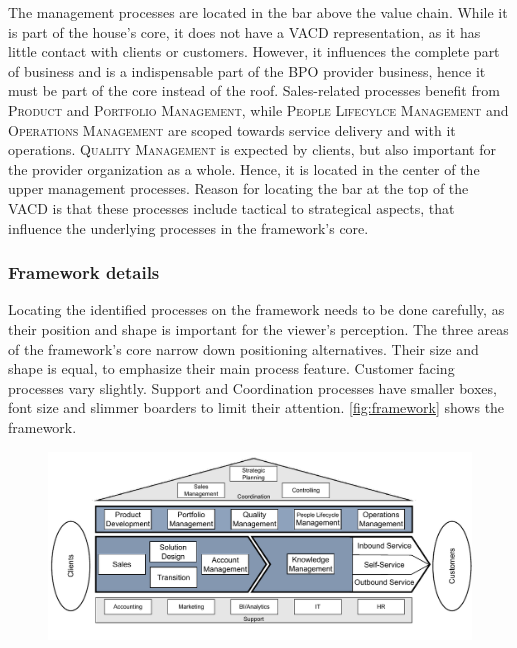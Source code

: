 	The management processes are located in the bar above the value chain. While it is part of the house's core, it does not have a \acrshort{VACD} representation, as it has little contact with clients or customers. However, it influences the complete part of business and is a indispensable part of the \acrshort{BPO} provider business, hence it must be part of the core instead of the roof. Sales-related processes benefit from \textsc{Product} and \textsc{Portfolio Management}, while \textsc{People Lifecylce Management} and \textsc{Operations Management} are scoped towards service delivery and with it operations. \textsc{Quality Management} is expected by clients, but also important for the provider organization as a whole. Hence, it is located in the center of the upper management processes. Reason for locating the bar at the top of the \acrshort{VACD} is that these processes include tactical to strategical aspects, that influence the underlying processes in the framework's core. 
	
	\subsubsection{Framework details}
	
	Locating the identified processes on the framework needs to be done carefully, as their position and shape is important for the viewer's perception. The three areas of the framework's core narrow down positioning alternatives. Their size and shape is equal, to emphasize their main process feature. Customer facing processes vary slightly. Support and Coordination processes have smaller boxes, font size and slimmer boarders to limit their attention. \Fig \ref{fig:framework} shows the framework.
	
		\begin{figure}[caption={Framework}, label={fig:framework}]
		{	\includegraphics[width=.99\textwidth]{figures/framework_full.pdf}}
	\end{figure} 
	
